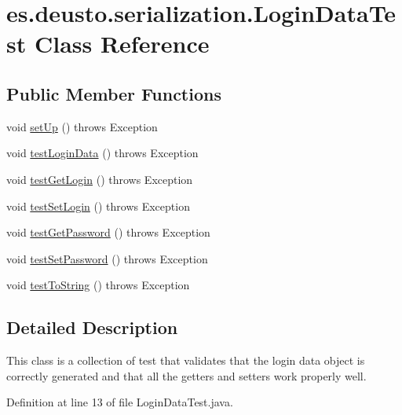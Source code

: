\hypertarget{classes_1_1deusto_1_1serialization_1_1_login_data_test}{}\section{es.\+deusto.\+serialization.\+Login\+Data\+Test Class Reference}
\label{classes_1_1deusto_1_1serialization_1_1_login_data_test}
\subsection*{Public Member Functions}
\begin{DoxyCompactItemize}
\item 
void \hyperlink{classes_1_1deusto_1_1serialization_1_1_login_data_test_ac6ebc4ad7913f80cdd7e5ca1de3bc8c3}{set\+Up} ()  throws Exception
\item 
void \hyperlink{classes_1_1deusto_1_1serialization_1_1_login_data_test_a74ecd0b9656b109638fc4949d589dc81}{test\+Login\+Data} ()  throws Exception 
\item 
void \hyperlink{classes_1_1deusto_1_1serialization_1_1_login_data_test_af8335d8d384051b02dc6bb2db7d6c9e2}{test\+Get\+Login} ()  throws Exception 
\item 
void \hyperlink{classes_1_1deusto_1_1serialization_1_1_login_data_test_ae7fdbf8f891137e9442c2560d38d109d}{test\+Set\+Login} ()  throws Exception 
\item 
void \hyperlink{classes_1_1deusto_1_1serialization_1_1_login_data_test_a7686b5fb1a89b9e0a5e8fa20dfc0fdee}{test\+Get\+Password} ()  throws Exception 
\item 
void \hyperlink{classes_1_1deusto_1_1serialization_1_1_login_data_test_aac8283467e1233be9119041e34aaf969}{test\+Set\+Password} ()  throws Exception 
\item 
void \hyperlink{classes_1_1deusto_1_1serialization_1_1_login_data_test_a3eae0dd2b793998614e5d6ac75c694ed}{test\+To\+String} ()  throws Exception 
\end{DoxyCompactItemize}


\subsection{Detailed Description}
This class is a collection of test that validates that the login data object is correctly generated and that all the getters and setters work properly well. 

Definition at line 13 of file Login\+Data\+Test.\+java.



